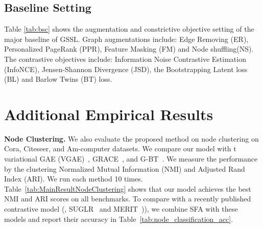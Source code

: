 \subsection{Baseline Setting}
Table \ref{tab:bsc} shows the augmentation and constrictive objective setting of the major baseline of GSSL. Graph augmentations include: Edge Removing (ER), 
Personalized PageRank (PPR), Feature Masking (FM) and Node shuffling(NS). The contrastive objectives include: Information Noise Contrastive Estimation (InfoNCE),  Jensen-Shannon Divergence (JSD),  the Bootstrapping Latent loss (BL) and Barlow Twins (BT) loss.
\label{app:modelsetting}
\begin{table}[h]
\caption{The setting of augmentation and contrastive objective of the major baseline and our approach.}\label{tab:bsc}
\end{table}

\section{Additional Empirical Results}
\label{sec:moreresult}

\noindent\textbf{Node Clustering.}
We also evaluate the proposed method on node clustering on Cora, Citeseer, and Am-computer datasets. We compare our model with t variational GAE (VGAE)~, GRACE~, and G-BT~. We measure the performance by the clustering Normalized Mutual Information (NMI) and Adjusted Rand Index (ARI). We run each method 10 times. %
Table~\ref{tab:MainResultNodeClustering}  shows that our model achieves the best NMI and ARI scores on all benchmarks. To compare with a recently published contrastive model (\ie, SUGLR~ and MERIT~)), we combine SFA with these models and report their accuracy in Table~\ref{tab:node_classification_acc}.


